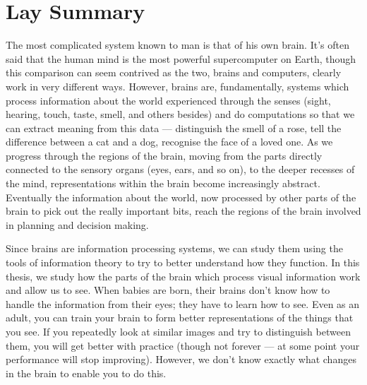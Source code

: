 
\begingroup

\let\clearpage\relax
\let\cleardoublepage\relax
\let\cleardoublepage\relax

\chapter*{Lay Summary}

The most complicated system known to man is that of his own brain.
It's often said that the human mind is the most powerful supercomputer on Earth, though this comparison can seem contrived as the two, brains and computers, clearly work in very different ways.
However, brains are, fundamentally, systems which process information about the world experienced through the senses (sight, hearing, touch, taste, smell, and others besides) and do computations so that we can extract meaning from this data --- distinguish the smell of a rose, tell the difference between a cat and a dog, recognise the face of a loved one.
As we progress through the regions of the brain, moving from the parts directly connected to the sensory organs (eyes, ears, and so on), to the deeper recesses of the mind, representations within the brain become increasingly abstract.
Eventually the information about the world, now processed by other parts of the brain to pick out the really important bits, reach the regions of the brain involved in planning and decision making.


Since brains are information processing systems, we can study them using the tools of information theory to try to better understand how they function.
In this thesis, we study how the parts of the brain which process visual information work and allow us to see.
When babies are born, their brains don't know how to handle the information from their eyes; they have to learn how to see.
Even as an adult, you can train your brain to form better representations of the things that you see.
If you repeatedly look at similar images and try to distinguish between them, you will get better with practice (though not forever --- at some point your performance will stop improving).
However, we don't know exactly what changes in the brain to enable you to do this.

